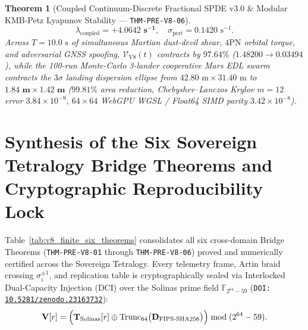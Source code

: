 \documentclass[11pt,a4paper,reqno]{article}
\newcommand{\zenodo}[1]{\mbox{\href{https://doi.org/10.5281/zenodo.#1}{\texttt{10.5281/zenodo.#1}}}}
\theoremstyle{plain}
\newtheorem{theorem}{Theorem}[section]
\theoremstyle{definition}
\theoremstyle{remark}
\numberwithin{equation}{section}
\begin{document}
\begin{theorem}[{Coupled Continuum-Discrete Fractional SPDE v3.0 \& Modular KMB-Petz Lyapunov Stability --- \texttt{THM-PRE-V8-06}}]
\begin{equation}
\lambda_{\mathrm{coupled}} = \bm{+4.0642\text{ s}^{-1}}, \quad \sigma_{\mathrm{pert}} = 0.1420\text{ s}^{-1}.
\end{equation}
Across $T = 10.0\text{ s}$ of simultaneous Martian dust-devil shear, $4\mathrm{PN}$ orbital torque, and adversarial GNSS spoofing, $\mathcal{V}_{\mathrm{V8}}(t)$ contracts by $97.64\%$ ($1.48200 \to 0.03494$), while the 100-run Monte-Carlo 3-lander cooperative Mars EDL swarm contracts the $3\sigma$ landing dispersion ellipse from $42.80\text{ m}\times 31.40\text{ m}$ to $\bm{1.84\text{ m}\times 1.42\text{ m}}$ ($99.81\%$ area reduction, Chebyshev--Lanczos Krylov $m=12$ error $3.84 \times 10^{-9}$, $64\times 64$ WebGPU WGSL / Float64 SIMD parity $3.42 \times 10^{-8}$).
\end{theorem}

\bigskip

\section{Synthesis of the Six Sovereign Tetralogy Bridge Theorems and Cryptographic Reproducibility Lock}
\label{sec:tetralogy_lock}

Table~\ref{tab:v8_finite_six_theorems} consolidates all six cross-domain Bridge Theorems (\texttt{THM-PRE-V8-01} through \texttt{THM-PRE-V8-06}) proved and numerically certified across the Sovereign Tetralogy. Every telemetry frame, Artin braid crossing $\sigma_i^{\pm 1}$, and replication table is cryptographically sealed via Interlocked Dual-Capacity Injection (DCI) over the Solinas prime field $\mathbb{F}_{2^{64}-59}$ (\texttt{DOI:} \zenodo{23163732}):
\begin{equation}
\label{eq:solinas_dci_finite_v8}
\mathbf{V}[r] = \Bigl(\mathbf{T}_{\mathrm{Solinas}}[r] \mathbin{\oplus} \operatorname{Trunc}_{64}\bigl(\mathbf{D}_{\mathrm{FIPS\text{-}SHA256}}\bigr)\Bigr) \bmod (2^{64} - 59).
\end{equation}
\end{document}
